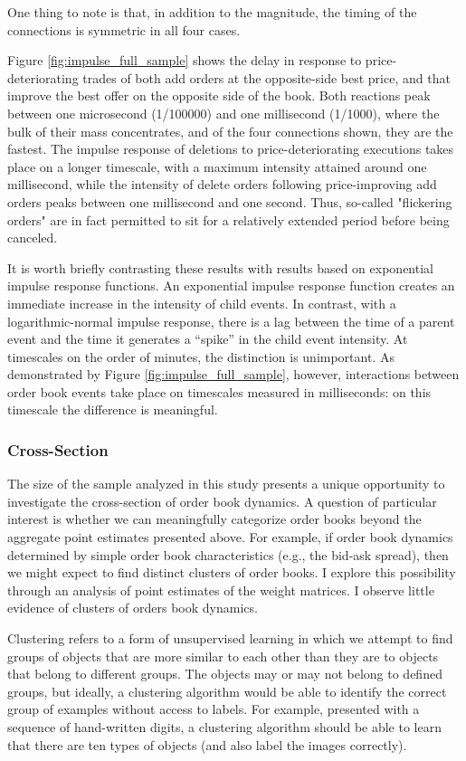 One thing to note is that, in addition to the magnitude, the timing of the connections is symmetric in all four cases.

Figure \ref{fig:impulse_full_sample} shows the delay in response to price-deteriorating trades of both add orders at the opposite-side best price, and that improve the best offer on the opposite side of the book. Both reactions peak between one microsecond (1/100000) and one millisecond (1/1000), where the bulk of their mass concentrates, and of the four connections shown, they are the fastest. The impulse response of deletions to price-deteriorating executions takes place on a longer timescale, with a maximum intensity attained around one millisecond, while the intensity of delete orders following price-improving add orders peaks between one millisecond and one second. Thus, so-called "flickering orders" are in fact permitted to sit for a relatively extended period before being canceled.

It is worth briefly contrasting these results with results based on exponential impulse response functions. An exponential impulse response function creates an immediate increase in the intensity of child events. In contrast, with a logarithmic-normal impulse response, there is a lag between the time of a parent event and the time it generates a “spike” in the child event intensity. At timescales on the order of minutes, the distinction is unimportant. As demonstrated by Figure \ref{fig:impulse_full_sample}, however, interactions between order book events take place on timescales measured in milliseconds: on this timescale the difference is meaningful.

\subsubsection{Cross-Section}
The size of the sample analyzed in this study presents a unique opportunity to investigate the cross-section of order book dynamics. A question of particular interest is whether we can meaningfully categorize order books beyond the aggregate point estimates presented above. For example, if order book dynamics determined by simple order book characteristics (e.g., the bid-ask spread), then we might expect to find distinct clusters of order books. I explore this possibility through an analysis of point estimates of the weight matrices. I observe little evidence of clusters of orders book dynamics.

Clustering refers to a form of unsupervised learning in which we attempt to find groups of objects that are more similar to each other than they are to objects that belong to different groups. The objects may or may not belong to defined groups, but ideally, a clustering algorithm would be able to identify the correct group of examples without access to labels. For example, presented with a sequence of hand-written digits, a clustering algorithm should be able to learn that there are ten types of objects (and also label the images correctly).

